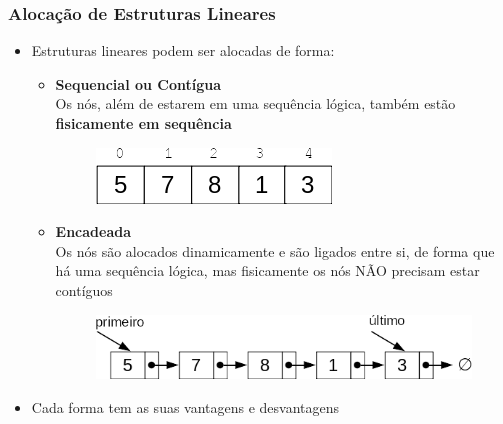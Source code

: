 \documentclass[aspectratio=169]{beamer}
\begin{document}
\begin{frame}[fragile]\frametitle{Alocação de Estruturas Lineares}
\begin{itemize}
	\item Estruturas lineares podem ser alocadas de forma:
	\begin{itemize}
		\item \textbf{Sequencial ou Contígua}\\Os nós, além de estarem em uma sequência lógica, também estão \textbf{fisicamente em sequência}
\begin{figure}[h]
	\centering
	\includegraphics[height=0.10\paperheight]{imagens/vetor.png}
\end{figure}
		\item \textbf{Encadeada}\\Os nós são alocados dinamicamente e são ligados entre si, de forma que há uma sequência lógica, mas fisicamente os nós NÃO precisam estar contíguos
\begin{figure}[h]
	\centering
	\includegraphics[height=0.15\paperheight]{imagens/lista_simplesmente_encadeada.png}
\end{figure}
	\end{itemize}
	\item Cada forma tem as suas vantagens e desvantagens
\end{itemize}
\end{frame}
\end{document}
